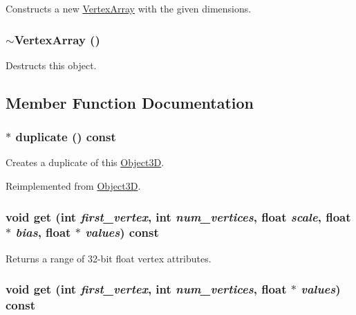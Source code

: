 Constructs a new \hyperlink{classm3g_1_1VertexArray}{VertexArray} with the given dimensions. \hypertarget{classm3g_1_1VertexArray_267fa63cb2f4216729437dc826415911}{
\subsubsection[{$\sim$VertexArray}]{\setlength{\rightskip}{0pt plus 5cm}$\sim${\bf VertexArray} ()}}
\label{classm3g_1_1VertexArray_267fa63cb2f4216729437dc826415911}


Destructs this object. 

\subsection{Member Function Documentation}
\hypertarget{classm3g_1_1VertexArray_f0dc6a5510bf837ef48129f344d666a8}{
\subsubsection[{duplicate}]{ $\ast$ duplicate () const}}
\label{classm3g_1_1VertexArray_f0dc6a5510bf837ef48129f344d666a8}


Creates a duplicate of this \hyperlink{classm3g_1_1Object3D}{Object3D}. 

Reimplemented from \hyperlink{classm3g_1_1Object3D_a25110dac934f867b83b73ad4741a0f4}{Object3D}.\hypertarget{classm3g_1_1VertexArray_1adedf59e0c6a047242a3914ca52b929}{
\subsubsection[{get}]{\setlength{\rightskip}{0pt plus 5cm}void get (int {\em first\_\-vertex}, \/  int {\em num\_\-vertices}, \/  float {\em scale}, \/  float $\ast$ {\em bias}, \/  float $\ast$ {\em values}) const}}
\label{classm3g_1_1VertexArray_1adedf59e0c6a047242a3914ca52b929}


Returns a range of 32-bit float vertex attributes. \hypertarget{classm3g_1_1VertexArray_79b1ffd7586fe23fb5e31661e4d296e3}{
\subsubsection[{get}]{\setlength{\rightskip}{0pt plus 5cm}void get (int {\em first\_\-vertex}, \/  int {\em num\_\-vertices}, \/  float $\ast$ {\em values}) const}}
\label{classm3g_1_1VertexArray_79b1ffd7586fe23fb5e31661e4d296e3}


